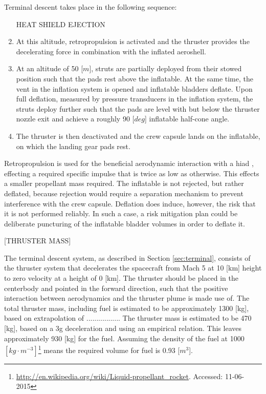 Terminal descent takes place in the following sequence:
\begin{enumerate}
\item [HEAT SHIELD EJECTION]
\item At this altitude, retropropulsion is activated and the thruster provides the decelerating force in combination with the inflated aeroshell.
\item At an altitude of 50 [$m$], struts are partially deployed from their stowed position such that the pads rest above the inflatable. At the same time, the vent in the inflation system is opened and inflatable bladders deflate. Upon full deflation, measured by pressure transducers in the inflation system, the struts deploy further such that the pads are level with but below the thruster nozzle exit and achieve a roughly 90 [$deg$] inflatable half-cone angle.
\item The thruster is then deactivated and the crew capsule lands on the inflatable, on which the landing gear pads rest.
\end{enumerate}
Retropropulsion is used for the beneficial aerodynamic interaction with a \gls{hiad} \cite{xxx}, effecting a required specific impulse that is twice as low as otherwise. This effects a smaller propellant mass required. The inflatable is not rejected, but rather deflated, because rejection would require a separation mechanism to prevent interference with the crew capsule. Deflation does induce, however, the risk that it is not performed reliably. In such a case, a risk mitigation plan could be deliberate puncturing of the inflatable bladder volumes in order to deflate it.

[THRUSTER MASS]


The terminal descent system, as described in Section \ref{sec:terminal}, consists of the thruster system that decelerates the spacecraft from Mach 5 at 10 [km] height to zero velocity at a height of 0 [km]. The thruster should be placed in the centerbody and pointed in the forward direction, such that the positive interaction between aerodynamics and the thruster plume is made use of. The total thruster mass, including fuel is estimated to be approximately 1300 [kg], based on extrapolation of .................
The thruster mass is estimated to be 470 [kg], based on a 3g deceleration and using an empirical relation\cite{Christian2006}. This leaves approximately 930 [kg] for the fuel. Assuming the density of the fuel at 1000 $[kg\cdot m^{-3}]$\footnote{\url{http://en.wikipedia.org/wiki/Liquid-propellant_rocket}. Accessed: 11-06-2015} means the required volume for fuel is 0.93 [$m^3$].